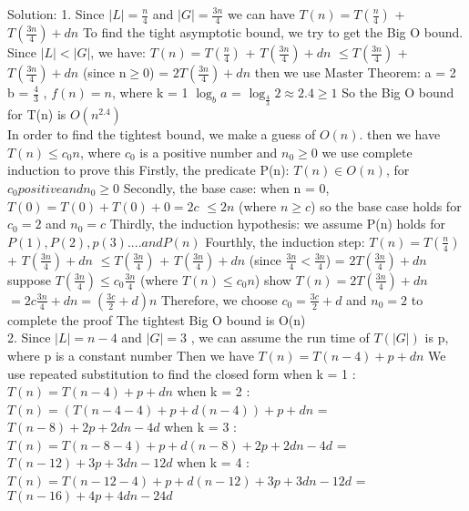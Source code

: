 \documentclass[12pt]{article}
\begin{document}
Solution:\vskip5pt
1. Since $|L| = \frac{n}{4}$ and $|G| = \frac{3n}{4}$\vskip5pt
we can have $T(n) = T(\frac{n}{4})$ + $T(\frac{3n}{4}) + dn$\vskip5pt
To find the tight asymptotic bound, we try to get the Big O bound.\vskip5pt
Since $|L| < |G|$, we have:\vskip5pt
$T(n) = T(\frac{n}{4})$ + $T(\frac{3n}{4}) + dn$\vskip5pt
\qquad $\le  T(\frac{3n}{4})$ + $T(\frac{3n}{4}) + dn$ (since n$\ge$0)\vskip5pt
\qquad = $2  T(\frac{3n}{4}) + dn$\vskip5pt
then we use Master Theorem:\vskip5pt 
a = 2 b = $\frac{4}{3}$ , $f(n) = n$, where k = 1\vskip5pt
$\log_{b}a$ = $\log_{\frac{4}{3}}2 \approx 2.4 \ge 1$\vskip5pt
So the Big O bound for T(n) is $O(n^{2.4})$\\[2ex]
In order to find the tightest bound, we make a guess of $O(n)$.\vskip5pt
then we have $T(n) \le c_0n$, where $c_0$ is a positive number and $n_0 \ge 0$\vskip5pt
we use complete induction to prove this\vskip5pt
Firstly, the predicate P(n): $T(n) \in O(n)$, for $c_0 positive and n_0 \ge 0$\vskip5pt
Secondly, the base case: when n = 0, $T(0) = T(0) + T(0) + 0 = 2c$\vskip5pt
\qquad \qquad \qquad \qquad \qquad\qquad\qquad\qquad\qquad \qquad $\le 2n$ (where $n\ge c$)\vskip5pt
so the base case holds for $c_0 =2$ and $n_0 = c$\vskip5pt 
Thirdly, the induction hypothesis: we assume P(n) holds for $P(1),P(2),p(3) .... and P(n)$\vskip5pt 
Fourthly, the induction step: \vskip5pt
$T(n) = T(\frac{n}{4})$ + $T(\frac{3n}{4}) + dn$\vskip5pt
\qquad $\le T(\frac{3n}{4})$ + $T(\frac{3n}{4}) + dn$ (since $\frac{3n}{4} < \frac{3n}{4} $)\vskip5pt
\qquad = $2 T(\frac{3n}{4}) + dn$ \vskip5pt
suppose $T(\frac{3n}{4}) \le c_0\frac{3n}{4}$ (where $T(n) \le c_0n$)\vskip5pt 
show $ T(n) = 2T(\frac{3n}{4}) + dn$ \vskip5pt
\qquad \qquad $= 2c\frac{3n}{4} + dn = (\frac{3c}{2} +d)n$\vskip5pt
Therefore, we choose $c_0 = \frac{3c}{2} +d$ and $n_0 = 2$ to complete the proof\vskip5pt
The tightest Big O bound is O(n)\\[2ex]
2. Since $|L| = n-4$ and $|G| = 3$ , we can assume the run time of $T(|G|)$ is p, where p is a constant number\vskip5pt
Then we have $T(n) = T(n-4) + p + dn$\vskip5pt
We use repeated substitution to find the closed form\vskip5pt
when k = 1 : $T(n) = T(n-4) + p + dn$\vskip5pt
when k = 2 : $T(n) = (T(n-4-4)+p + d(n-4)) + p + dn$\vskip5pt
\qquad \qquad \qquad = $T(n-8) + 2p + 2dn - 4d$ \vskip5pt
when k = 3 : $T(n) = T(n-8-4)+ p + d(n-8) + 2p + 2dn -4d $\vskip5pt
\qquad \qquad \qquad = $T(n-12) + 3p + 3dn -12d$\vskip5pt
when k = 4 : $T(n) = T(n-12-4)+ p + d(n-12) + 3p + 3dn -12d $\vskip5pt 
\qquad \qquad \qquad = $T(n-16) + 4p + 4dn - 24d$\vskip5pt
\end{document}
